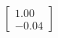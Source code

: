 \documentclass[preview]{standalone}
\begin{document}
\begin{align*}
\begin{bmatrix} 1.00 \\ -0.04 \end{bmatrix}
\end{align*}
\end{document}
